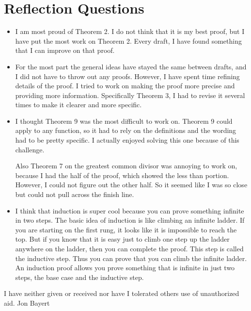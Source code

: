 \documentclass{article}
\begin{document}
\section{Reflection Questions}
\begin{itemize}
\item I am most proud of Theorem 2. I do not think that it is my best proof, but I have put the most work on Theorem 2. Every draft, I have found something that I can improve on that proof.

\item For the most part the general ideas have stayed the same between drafts, and I did not have to throw out any proofs. However, I have spent time refining details of the proof. I tried to work on making the proof more precise and providing more information. Specifically Theorem 3, I had to revise it several times to make it clearer and more specific.

\item I thought Theorem 9 was the most difficult to work on. Theorem 9 could apply to any function, so it had to rely on the definitions and the wording had to be pretty specific. I actually enjoyed solving this one because of this challenge.

Also Theorem 7 on the greatest common divisor was annoying to work on, because I had the half of the proof, which showed the less than portion. However, I could not figure out the other half. So it seemed like I was so close but could not pull across the finish line.

\item I think that induction is super cool because you can prove something infinite in two steps. The basic idea of induction is like climbing an infinite ladder. If you are starting on the first rung, it looks like it is impossible to reach the top. But if you know that it is easy just to climb one step up the ladder anywhere on the ladder, then you can complete the proof. This step is called the inductive step. Thus you can prove that you can climb the infinite ladder. An induction proof allows you prove something that is infinite in just two steps, the base case and the inductive step. 
\end{itemize}

I have neither given or received nor have I tolerated others use of unauthorized aid. Jon Bayert
\end{document}
